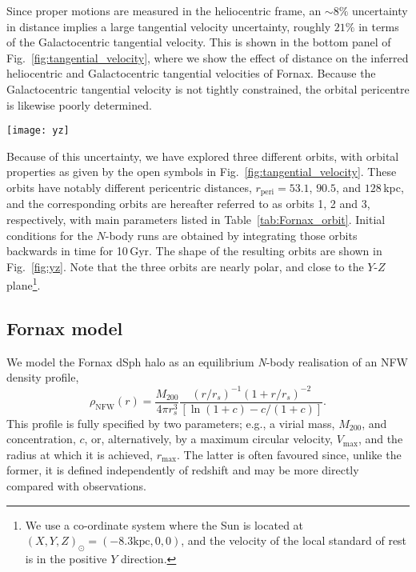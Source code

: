 \documentclass[fleqn,usenatbib]{mnras}
\begin{document}
Since proper motions are measured in the heliocentric frame, an $\sim 8\%$ uncertainty in distance implies a large tangential velocity uncertainty, roughly $21\%$ in terms of the Galactocentric tangential velocity. This is shown in the bottom panel of Fig.~\ref{fig:tangential_velocity}, where we show the effect of distance on the inferred heliocentric and Galactocentric tangential velocities of Fornax. Because the Galactocentric tangential velocity is not tightly constrained, the orbital pericentre is likewise poorly determined.

\begin{figure*}
	\texttt{[image: yz]}
    \caption{Projected trace on the $Y,Z$ plane of the three orbits considered in this study (see Table~\ref{tab:Fornax_orbit}). The current position of Fornax is indicated by a red cross. Intervals of 2\,Gyr along the orbit are shown using filled circles.}
    \label{fig:yz}
\end{figure*}

Because of this uncertainty, we have explored three different orbits, with orbital properties as given by the open symbols in Fig.~\ref{fig:tangential_velocity}. These orbits have notably different pericentric distances, $r_\mathrm{peri} = 53.1$, $90.5$, and $128$\,kpc, and the corresponding orbits are hereafter referred to as orbits 1, 2 and 3, respectively, with main parameters listed in Table~\ref{tab:Fornax_orbit}. Initial conditions for the $N$-body runs are obtained by integrating those orbits backwards in time for 10\,Gyr. The shape of the resulting orbits are shown in Fig.~\ref{fig:yz}. Note that the three orbits are nearly polar, and close to the $Y$-$Z$ plane\footnote{We use a co-ordinate system where the Sun is located at $(X,Y,Z)_\odot=(-8.3 \mathrm{kpc},0,0)$, and the velocity of the local standard of rest is in the positive $Y$ direction.}. 

\subsection{Fornax model}
\label{sec:Fornax}

We model the Fornax dSph halo as an equilibrium \textit{N}-body realisation of an NFW density profile,
\begin{equation}
    \rho_\mathrm{NFW}(r)=\frac{M_{200}}{4\pi r_s^3}\frac{(r/r_s)^{-1}(1+r/r_s)^{-2}}{[\ln(1+c)-c/(1+c)]}.
	\label{eq:NFW}
\end{equation}
This profile is fully specified by two parameters; e.g., a virial mass, $M_{200}$, and concentration, $c$, or, alternatively, by a maximum circular velocity, $V_\mathrm{max}$, and the radius at which it is achieved, $r_\mathrm{max}$. The latter is often favoured since, unlike the former, it is defined independently of redshift and may be more directly compared with observations.
\end{document}
